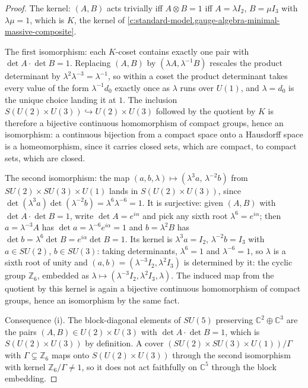 \documentclass[11pt]{article}
\theoremstyle{definition}
\theoremstyle{plain}
\providecommand{\C}{}\renewcommand{\C}{\mathbb{C}}
\begin{document}
\begin{proof}
The kernel: $(A, B)$ acts trivially iff $A \otimes B = 1$ iff $A = \lambda I_{2}$, $B = \mu I_{3}$ with $\lambda\mu = 1$, which is $K$, the kernel of \ref{c:standard-model.gauge-algebra-minimal-massive-composite}.

The first isomorphism: each $K$-coset contains exactly one pair with $\det A \cdot \det B = 1$. Replacing $(A, B)$ by $(\lambda A, \lambda^{-1}B)$ rescales the product determinant by $\lambda^{2}\lambda^{-3} = \lambda^{-1}$, so within a coset the product determinant takes every value of the form $\lambda^{-1}d_{0}$ exactly once as $\lambda$ runs over $U(1)$, and $\lambda = d_{0}$ is the unique choice landing it at $1$. The inclusion $S(U(2) \times U(3)) \hookrightarrow U(2) \times U(3)$ followed by the quotient by $K$ is therefore a bijective continuous homomorphism of compact groups, hence an isomorphism: a continuous bijection from a compact space onto a Hausdorff space is a homeomorphism, since it carries closed sets, which are compact, to compact sets, which are closed.

The second isomorphism: the map $(a, b, \lambda) \mapsto (\lambda^{3}a,\, \lambda^{-2}b)$ from $SU(2) \times SU(3) \times U(1)$ lands in $S(U(2) \times U(3))$, since $\det(\lambda^{3}a)\det(\lambda^{-2}b) = \lambda^{6}\lambda^{-6} = 1$. It is surjective: given $(A, B)$ with $\det A \cdot \det B = 1$, write $\det A = e^{i\alpha}$ and pick any sixth root $\lambda^{6} = e^{i\alpha}$; then $a = \lambda^{-3}A$ has $\det a = \lambda^{-6}e^{i\alpha} = 1$ and $b = \lambda^{2}B$ has $\det b = \lambda^{6}\det B = e^{i\alpha}\det B = 1$. Its kernel is $\lambda^{3}a = I_{2}$, $\lambda^{-2}b = I_{3}$ with $a \in SU(2)$, $b \in SU(3)$: taking determinants, $\lambda^{6} = 1$ and $\lambda^{-6} = 1$, so $\lambda$ is a sixth root of unity and $(a, b) = (\lambda^{-3}I_{2}, \lambda^{2}I_{3})$ is determined by it: the cyclic group $\mathbb{Z}_{6}$, embedded as $\lambda \mapsto (\lambda^{-3}I_{2}, \lambda^{2}I_{3}, \lambda)$. The induced map from the quotient by this kernel is again a bijective continuous homomorphism of compact groups, hence an isomorphism by the same fact.

Consequence (i). The block-diagonal elements of $SU(5)$ preserving $\C^{2} \oplus \C^{3}$ are the pairs $(A, B) \in U(2) \times U(3)$ with $\det A \cdot \det B = 1$, which is $S(U(2) \times U(3))$ by definition. A cover $(SU(2) \times SU(3) \times U(1))/\Gamma$ with $\Gamma \subsetneq \mathbb{Z}_{6}$ maps onto $S(U(2) \times U(3))$ through the second isomorphism with kernel $\mathbb{Z}_{6}/\Gamma \neq 1$, so it does not act faithfully on $\C^{5}$ through the block embedding.


\end{proof}
\end{document}
